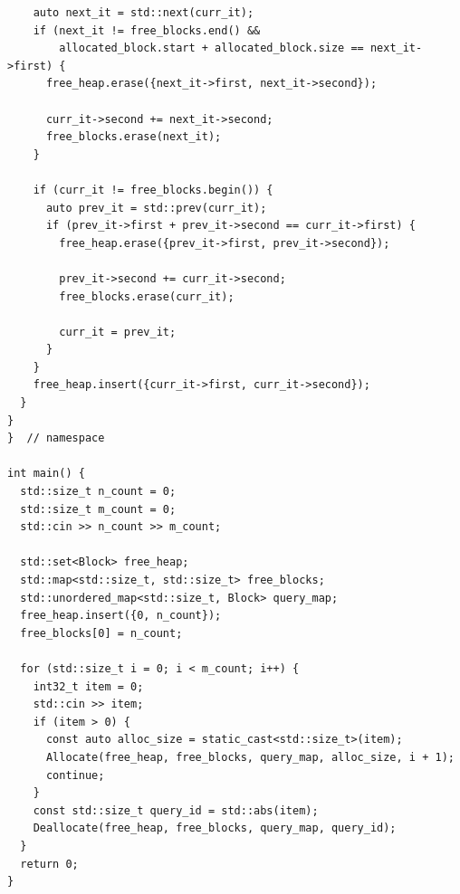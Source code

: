 \begin{lstlisting}
    auto next_it = std::next(curr_it);
    if (next_it != free_blocks.end() &&
        allocated_block.start + allocated_block.size == next_it->first) {
      free_heap.erase({next_it->first, next_it->second});

      curr_it->second += next_it->second;
      free_blocks.erase(next_it);
    }

    if (curr_it != free_blocks.begin()) {
      auto prev_it = std::prev(curr_it);
      if (prev_it->first + prev_it->second == curr_it->first) {
        free_heap.erase({prev_it->first, prev_it->second});

        prev_it->second += curr_it->second;
        free_blocks.erase(curr_it);

        curr_it = prev_it;
      }
    }
    free_heap.insert({curr_it->first, curr_it->second});
  }
}
}  // namespace

int main() {
  std::size_t n_count = 0;
  std::size_t m_count = 0;
  std::cin >> n_count >> m_count;

  std::set<Block> free_heap;
  std::map<std::size_t, std::size_t> free_blocks;
  std::unordered_map<std::size_t, Block> query_map;
  free_heap.insert({0, n_count});
  free_blocks[0] = n_count;

  for (std::size_t i = 0; i < m_count; i++) {
    int32_t item = 0;
    std::cin >> item;
    if (item > 0) {
      const auto alloc_size = static_cast<std::size_t>(item);
      Allocate(free_heap, free_blocks, query_map, alloc_size, i + 1);
      continue;
    }
    const std::size_t query_id = std::abs(item);
    Deallocate(free_heap, free_blocks, query_map, query_id);
  }
  return 0;
}
\end{lstlisting}